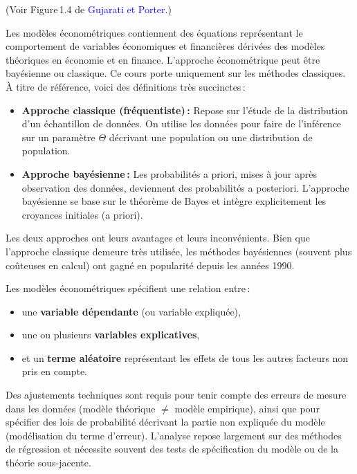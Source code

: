 \documentclass[14pt]{extarticle} %
\newcommand{\livre}[1]{\textcolor{blue}{#1}}
\begin{document}
(Voir Figure 1.4 de \livre{Gujarati et Porter}.)

Les modèles économétriques contiennent des équations représentant le comportement de variables économiques et financières dérivées des modèles théoriques en économie et en finance. L’approche économétrique peut être bayésienne ou classique. Ce cours porte uniquement sur les méthodes classiques. À titre de référence, voici des définitions très succinctes :

\begin{itemize}
    \item \textbf{Approche classique (fréquentiste) :} Repose sur l’étude de la distribution d’un échantillon de données. On utilise les données pour faire de l’inférence sur un paramètre $\Theta$ décrivant une population ou une distribution de population.
    \item \textbf{Approche bayésienne :} Les probabilités a priori, mises à jour après observation des données, deviennent des probabilités a posteriori. L’approche bayésienne se base sur le théorème de Bayes et intègre explicitement les croyances initiales (a priori).
\end{itemize}

Les deux approches ont leurs avantages et leurs inconvénients. Bien que l’approche classique demeure très utilisée, les méthodes bayésiennes (souvent plus coûteuses en calcul) ont gagné en popularité depuis les années 1990.

Les modèles économétriques spécifient une relation entre :
\begin{itemize}
    \item une \textbf{variable dépendante} (ou variable expliquée), 
    \item une ou plusieurs \textbf{variables explicatives}, 
    \item et un \textbf{terme aléatoire} représentant les effets de tous les autres facteurs non pris en compte.
\end{itemize}

Des ajustements techniques sont requis pour tenir compte des erreurs de mesure dans les données (modèle théorique $\neq$ modèle empirique), ainsi que pour spécifier des lois de probabilité décrivant la partie non expliquée du modèle (modélisation du terme d’erreur). L’analyse repose largement sur des méthodes de régression et nécessite souvent des tests de spécification du modèle ou de la théorie sous-jacente.

\end{document}
